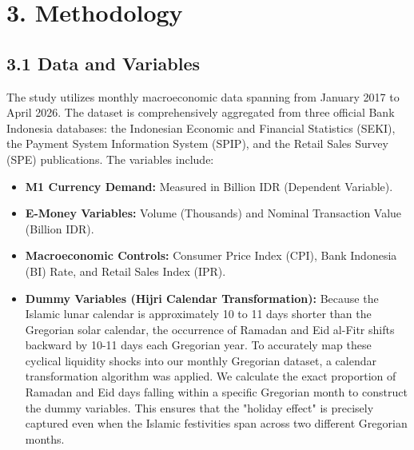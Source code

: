\documentclass[12pt, letterpaper]{article}
\begin{document}
\section*{3. Methodology}
\subsection*{3.1 Data and Variables}
The study utilizes monthly macroeconomic data spanning from January 2017 to April 2026. The dataset is comprehensively aggregated from three official Bank Indonesia databases: the Indonesian Economic and Financial Statistics (SEKI), the Payment System Information System (SPIP), and the Retail Sales Survey (SPE) publications. The variables include:
\begin{itemize}
    \item \textbf{M1 Currency Demand:} Measured in Billion IDR (Dependent Variable).
    \item \textbf{E-Money Variables:} Volume (Thousands) and Nominal Transaction Value (Billion IDR).
    \item \textbf{Macroeconomic Controls:} Consumer Price Index (CPI), Bank Indonesia (BI) Rate, and Retail Sales Index (IPR).
    \item \textbf{Dummy Variables (Hijri Calendar Transformation):} Because the Islamic lunar calendar is approximately 10 to 11 days shorter than the Gregorian solar calendar, the occurrence of Ramadan and Eid al-Fitr shifts backward by 10-11 days each Gregorian year. To accurately map these cyclical liquidity shocks into our monthly Gregorian dataset, a calendar transformation algorithm was applied. We calculate the exact proportion of Ramadan and Eid days falling within a specific Gregorian month to construct the dummy variables. This ensures that the "holiday effect" is precisely captured even when the Islamic festivities span across two different Gregorian months.
\end{itemize}
\end{document}

